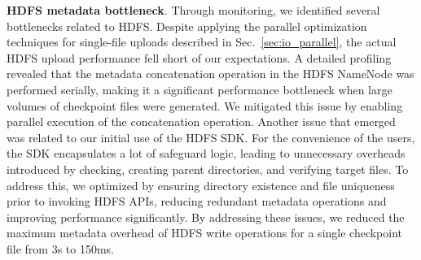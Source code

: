 \noindent \textbf{HDFS metadata bottleneck}. %
Through monitoring, we identified several bottlenecks related to HDFS. Despite applying the parallel optimization techniques for single-file uploads described in Sec.~\ref{sec:io_parallel}, the actual HDFS upload performance fell short of our expectations.
A detailed profiling revealed that the metadata concatenation operation in the HDFS NameNode was performed serially, making it a significant performance bottleneck when large volumes of checkpoint files were generated. We mitigated this issue by enabling parallel execution of the concatenation operation.
Another issue that emerged was related to our initial use of the HDFS SDK.
For the convenience of the users, the SDK encapsulates a lot of safeguard logic, leading to unnecessary overheads introduced by checking, creating parent directories, and verifying target files.
To address this, we optimized \sys{} by ensuring directory existence and file uniqueness prior to invoking HDFS APIs, reducing redundant metadata operations and improving performance significantly.
By addressing these issues, we reduced the maximum metadata overhead of HDFS write operations for a single checkpoint file from 3s to  150ms.
